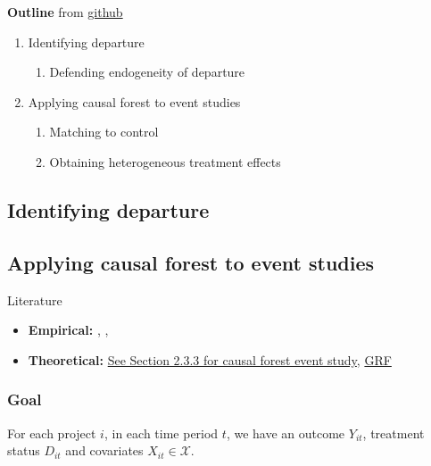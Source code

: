 \documentclass[source/paper/main.tex]{subfiles}
\begin{document}
\textbf{Outline} from \href{https://github.com/liaochris/oss_hierarchy/issues/2#issuecomment-2589020215}{github}
\begin{enumerate}
    \item Identifying departure
        \begin{enumerate}
            \item Defending endogeneity of departure
        \end{enumerate}
    \item Applying causal forest to event studies
    \begin{enumerate}
        \item Matching to control
        \item Obtaining heterogeneous treatment effects
    \end{enumerate}
\end{enumerate}

\subsection{Identifying departure}

\subsection{Applying causal forest to event studies}
Literature
\begin{itemize}
    \item \textbf{Empirical: } \cite{iyengar_impact_2022}, \cite{cui_tax-induced_2022}, \cite{guo_effect_2021}
    \item \textbf{Theoretical:} \href{https://pure.au.dk/ws/portalfiles/portal/198663023/Nicolaj_Mu_hlbach_PhD_dissertation.pdf}{See Section 2.3.3 for causal forest event study}, \href{https://arxiv.org/pdf/1610.01271}{GRF}
\end{itemize}

\subsubsection{Goal}
For each project $i$, in each time period $t$, we have an outcome $Y_{it}$, treatment status $D_{it}$ and covariates $X_{it} \in \mathcal{X}$.
\end{document}

